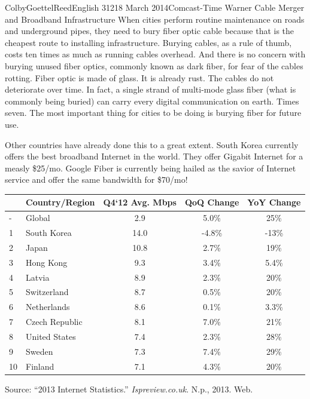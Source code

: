 \documentclass[12pt]{article}
\begin{document}
\begin{mla}{Colby}{Goettel}{Reed}{English 312}{18 March 2014}{Comcast-Time Warner Cable Merger and Broadband Infrastructure}
When cities perform routine maintenance on roads and underground pipes, they need to bury fiber optic cable because that is the cheapest route to installing infrastructure. Burying cables, as a rule of thumb, costs ten times as much as running cables overhead. And there is no concern with burying unused fiber optics, commonly known as dark fiber, for fear of the cables rotting. Fiber optic is made of glass. It is already rust. The cables do not deteriorate over time. In fact, a single strand of multi-mode glass fiber (what is commonly being buried) can carry every digital communication on earth. Times seven. The most important thing for cities to be doing is burying fiber for future use.

Other countries have already done this to a great extent. South Korea currently offers the best broadband Internet in the world. They offer Gigabit Internet for a measly \$25/mo. Google Fiber is currently being hailed as the savior of Internet service and offer the same bandwidth for \$70/mo!

\begin{minipage}{\linewidth}
    \label{table:connection-speed}
    \begin{tabular}{llccc}
        \toprule
        ~  & Country/Region & Q4`12 Avg. Mbps & QoQ Change & YoY Change \\
        \midrule
        -  & Global         & 2.9  & 5.0\%  & 25\% \\
        1  & South Korea    & 14.0 & -4.8\% & -13\% \\
        2  & Japan          & 10.8 & 2.7\%  & 19\% \\
        3  & Hong Kong      & 9.3  & 3.4\%  & 5.4\% \\
        4  & Latvia         & 8.9  & 2.3\%  & 20\% \\
        5  & Switzerland    & 8.7  & 0.5\%  & 20\% \\
        6  & Netherlands    & 8.6  & 0.1\%  & 3.3\% \\
        7  & Czech Republic & 8.1  & 7.0\%  & 21\% \\
        8  & United States  & 7.4  & 2.3\%  & 28\% \\
        9  & Sweden         & 7.3  & 7.4\%  & 29\% \\
        10 & Finland        & 7.1  & 4.3\%  & 20\% \\
        \bottomrule
    \end{tabular}\par
    \bigskip
    Source: ``2013 Internet Statistics.'' \textit{Ispreview.co.uk}. N.p., 2013. Web.\bigskip
\end{minipage}


\end{mla}
\end{document}
